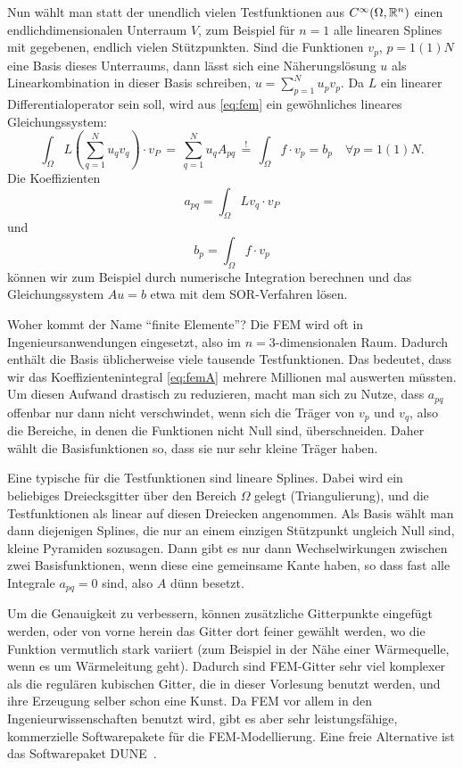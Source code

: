 Nun wählt man statt der unendlich vielen Testfunktionen
aus $C^\infty(\Omega, \mathbb{R}^n)$ einen endlichdimensionalen Unterraum
$V$, zum Beispiel für $n=1$ alle linearen Splines mit gegebenen,
endlich vielen Stützpunkten. Sind die Funktionen $v_p$, $p=1(1)N$ eine
Basis dieses Unterraums, dann lässt sich eine Näherungslösung $u$ als
Linearkombination in dieser Basis schreiben, $u=\sum_{p=1}^N
u_pv_p$. Da $L$ ein linearer Differentialoperator sein soll, wird aus
\eqref{eq:fem} ein gewöhnliches lineares Gleichungssystem:
\begin{equation}
  \int_\Omega L\left(\sum_{q=1}^N
    u_qv_q\right)\cdot v_P \,=\, \sum_{q=1}^N
  u_q A_{pq} \,\stackrel{!}{=}\,
  \int_\Omega f\cdot v_p = b_p\quad\forall p=1(1)N.
\end{equation}
Die Koeffizienten
\begin{equation}
  \label{eq:femA}
  a_{pq} = \int_\Omega L v_q\cdot v_P
\end{equation}
und
\begin{equation}
  \label{eq:femb}
  b_p = \int_\Omega f\cdot v_p
\end{equation}
können wir zum Beispiel durch numerische Integration berechnen und das
Gleichungssystem $Au=b$ etwa mit dem SOR-Verfahren lösen.

Woher kommt der Name "`finite Elemente"'? Die FEM wird oft in
Ingenieursanwendungen eingesetzt, also im $n=3$-dimensionalen Raum.
Dadurch enthält die Basis üblicherweise viele tausende
Testfunktionen. Das bedeutet, dass wir das Koeffizientenintegral
\eqref{eq:femA} mehrere Millionen mal auswerten müssten. Um diesen
Aufwand drastisch zu reduzieren, macht man sich zu Nutze, dass
$a_{pq}$ offenbar nur dann nicht verschwindet, wenn sich die Träger
von $v_p$ und $v_q$, also die Bereiche, in denen die Funktionen nicht
Null sind, überschneiden. Daher wählt die Basisfunktionen so, dass sie
nur sehr kleine Träger haben.

Eine typische für die Testfunktionen sind lineare Splines. Dabei wird
ein beliebiges Dreiecksgitter über den Bereich $\Omega$ gelegt
(Triangulierung), und die Testfunktionen als linear auf diesen
Dreiecken angenommen. Als Basis wählt man dann diejenigen Splines, die
nur an einem einzigen Stützpunkt ungleich Null sind, kleine Pyramiden
sozusagen. Dann gibt es nur dann Wechselwirkungen zwischen zwei
Basisfunktionen, wenn diese eine gemeinsame Kante haben, so dass fast
alle Integrale $a_{pq}=0$ sind, also $A$ dünn besetzt.

Um die Genauigkeit zu verbessern, können zusätzliche Gitterpunkte
eingefügt werden, oder von vorne herein das Gitter dort feiner gewählt
werden, wo die Funktion vermutlich stark variiert (zum Beispiel in der
Nähe einer Wärmequelle, wenn es um Wärmeleitung geht). Dadurch sind
FEM-Gitter sehr viel komplexer als die regulären kubischen Gitter, die
in dieser Vorlesung benutzt werden, und ihre Erzeugung selber schon
eine Kunst. Da FEM vor allem in den Ingenieurwissenschaften benutzt
wird, gibt es aber sehr leistungsfähige, kommerzielle Softwarepakete
für die FEM-Modellierung. Eine freie Alternative ist das Softwarepaket
DUNE~\cite{dune,duneweb}.

